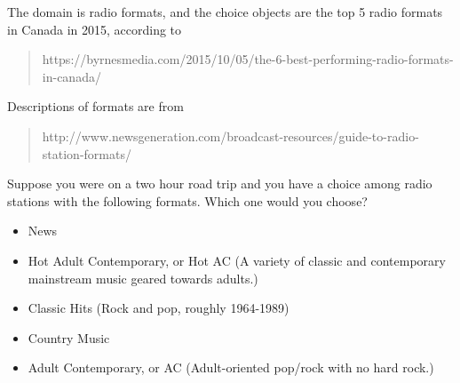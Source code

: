The domain is radio formats, and the choice objects are the top 5 radio formats in Canada in 2015, according to
\begin{quotation}
	https://byrnesmedia.com/2015/10/05/the-6-best-performing-radio-formats-in-canada/
\end{quotation}
Descriptions of formats are from
\begin{quotation}
	http://www.newsgeneration.com/broadcast-resources/guide-to-radio-station-formats/
\end{quotation}

\begin{tcolorbox}
Suppose you were on a two hour road trip and you have a choice among radio stations with the following formats.
Which one would you choose?

\begin{itemize}
	\setlength\itemsep{-5pt}
	\item News
	\item Hot Adult Contemporary, or Hot AC
	(A variety of classic and contemporary mainstream music geared towards adults.)
	\item Classic Hits (Rock and pop, roughly 1964-1989)
	\item Country Music
	\item Adult Contemporary, or AC (Adult-oriented pop/rock with no hard rock.)
\end{itemize}
\end{tcolorbox}
